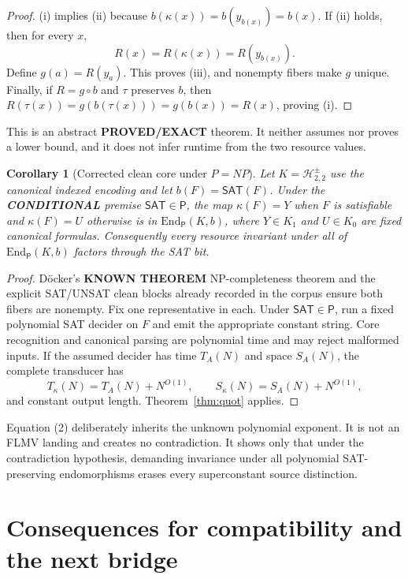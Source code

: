 \documentclass[11pt]{article}
\newtheorem{corollary}[theorem]{Corollary}
\newcommand{\SAT}{\mathsf{SAT}}
\newcommand{\Hsigned}{\mathcal H^{\pm}_{2,2}}
\newcommand{\EXACT}{\textbf{PROVED/EXACT}}
\newcommand{\KNOWN}{\textbf{KNOWN THEOREM}}
\newcommand{\COND}{\textbf{CONDITIONAL}}
\begin{document}
\begin{proof}
(i) implies (ii) because $b(\kappa(x))=b(y_{b(x)})=b(x)$.  If (ii) holds,
then for every $x$,
\[
 R(x)=R(\kappa(x))=R(y_{b(x)}).
\]
Define $g(a)=R(y_a)$.  This proves (iii), and nonempty fibers make $g$
unique.  Finally, if $R=g\circ b$ and $\tau$ preserves $b$, then
$R(\tau(x))=g(b(\tau(x)))=g(b(x))=R(x)$, proving (i).
\end{proof}

This is an abstract \EXACT{} theorem.  It neither assumes nor proves a lower
bound, and it does not infer runtime from the two resource values.

\begin{corollary}[Corrected clean core under $P=NP$]
\label{cor:clean}
Let $K=\Hsigned$ use the canonical indexed encoding and let
$b(F)=\SAT(F)$.  Under the \COND{} premise $\SAT\in\mathsf P$, the map
\(\kappa(F)=Y\) when $F$ is satisfiable and \(\kappa(F)=U\) otherwise is in
$\mathrm{End}_{\mathsf P}(K,b)$, where $Y\in K_1$ and $U\in K_0$ are fixed
canonical formulas.  Consequently every resource invariant under all of
$\mathrm{End}_{\mathsf P}(K,b)$ factors through the SAT bit.
\end{corollary}

\begin{proof}
D\"ocker's \KNOWN{} NP-completeness theorem and the explicit SAT/UNSAT clean
blocks already recorded in the corpus ensure both fibers are nonempty.  Fix
one representative in each.  Under $\SAT\in\mathsf P$, run a fixed
polynomial SAT decider on $F$ and emit the appropriate constant string.
Core recognition and canonical parsing are polynomial time and may reject
malformed inputs.  If the assumed decider has time $T_A(N)$ and space
$S_A(N)$, the complete transducer has
\[
 T_\kappa(N)=T_A(N)+N^{O(1)},\qquad
 S_\kappa(N)=S_A(N)+N^{O(1)},                              \tag{2}
\]
and constant output length.  Theorem~\ref{thm:quot} applies.
\end{proof}

Equation (2) deliberately inherits the unknown polynomial exponent.  It is
not an FLMV landing and creates no contradiction.  It shows only that under
the contradiction hypothesis, demanding invariance under all polynomial
SAT-preserving endomorphisms erases every superconstant source distinction.

\section{Consequences for compatibility and the next bridge}
\end{document}
